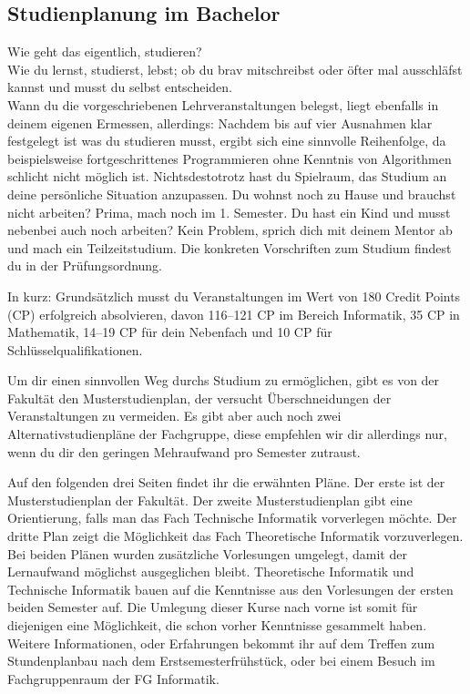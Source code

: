 \subsection{Studienplanung im Bachelor}

Wie geht das eigentlich, studieren?\\
Wie du lernst, studierst, lebst; ob du brav mitschreibst oder öfter mal ausschläfst kannst und musst du selbst entscheiden. \\
Wann du die vorgeschriebenen Lehrveranstaltungen belegst, liegt ebenfalls in deinem eigenen Ermessen, allerdings: Nachdem bis auf vier Ausnahmen klar festgelegt ist was du studieren musst, ergibt sich eine sinnvolle Reihenfolge, da beispielsweise fortgeschrittenes Programmieren ohne Kenntnis von Algorithmen schlicht nicht möglich ist. Nichtsdestotrotz hast du Spielraum, das Studium an deine persönliche Situation anzupassen.
Du wohnst noch zu Hause und brauchst nicht arbeiten? Prima, mach noch \iftoggle{winter}{Theoretische Informatik 1}{Technische Informatik 2} im 1. Semester. Du hast ein Kind und musst nebenbei auch noch arbeiten? Kein Problem, sprich dich mit deinem Mentor ab und mach ein Teilzeitstudium. Die konkreten Vorschriften zum Studium findest du in der Prüfungsordnung.

In kurz: Grundsätzlich musst du Veranstaltungen im Wert von 180 Credit Points (CP) erfolgreich absolvieren, davon 116–121 CP im Bereich Informatik, 35 CP in Mathematik, 14–19 CP für dein Nebenfach und 10 CP für Schlüsselqualifikationen.



Um dir einen sinnvollen Weg durchs Studium zu ermöglichen, gibt es von der Fakultät den Musterstudienplan, der versucht Überschneidungen der Veranstaltungen zu vermeiden. Es gibt aber auch noch zwei Alternativstudienpläne der Fachgruppe, diese empfehlen wir dir allerdings nur, wenn du dir den geringen Mehraufwand pro Semester zutraust.



Auf den folgenden drei Seiten findet ihr die erwähnten Pläne. Der erste ist der Musterstudienplan der Fakultät. Der zweite Musterstudienplan gibt eine Orientierung, falls man das Fach Technische Informatik vorverlegen möchte. Der dritte Plan zeigt die Möglichkeit das Fach Theoretische Informatik vorzuverlegen. Bei beiden Plänen wurden zusätzliche Vorlesungen umgelegt, damit der Lernaufwand möglichst ausgeglichen bleibt. Theoretische Informatik und Technische Informatik bauen auf die Kenntnisse aus den Vorlesungen der ersten beiden Semester auf. Die Umlegung dieser Kurse nach vorne ist somit für diejenigen eine Möglichkeit, die schon vorher Kenntnisse gesammelt haben. Weitere Informationen, oder Erfahrungen bekommt ihr auf dem Treffen zum Stundenplanbau nach dem Erstsemesterfrühstück, oder bei einem Besuch im Fachgruppenraum der FG Informatik.

